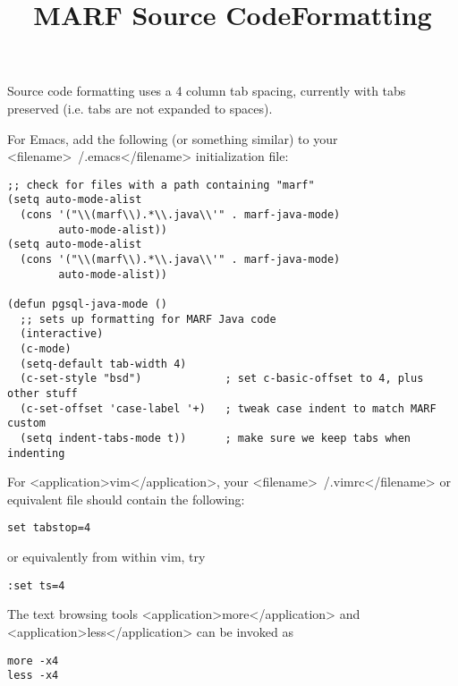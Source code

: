   \title{MARF Source Code}

   \title{Formatting}

   \par
    Source code formatting uses a 4 column tab spacing, currently with
    tabs preserved (i.e. tabs are not expanded to spaces).
   

   \par
    For Emacs, add the following (or something similar)
    to your <filename>~/.emacs</filename>
    initialization file:

\begin{verbatim}
;; check for files with a path containing "marf"
(setq auto-mode-alist
  (cons '("\\(marf\\).*\\.java\\'" . marf-java-mode)
        auto-mode-alist))
(setq auto-mode-alist
  (cons '("\\(marf\\).*\\.java\\'" . marf-java-mode)
        auto-mode-alist))

(defun pgsql-java-mode ()
  ;; sets up formatting for MARF Java code
  (interactive)
  (c-mode)
  (setq-default tab-width 4)
  (c-set-style "bsd")             ; set c-basic-offset to 4, plus other stuff
  (c-set-offset 'case-label '+)   ; tweak case indent to match MARF custom
  (setq indent-tabs-mode t))      ; make sure we keep tabs when indenting
\end{verbatim}
   

   \par
    For <application>vim</application>, your
    <filename>~/.vimrc</filename> or equivalent file should contain
    the following:

\begin{verbatim}
set tabstop=4
\end{verbatim}

    or equivalently from within vim, try

\begin{verbatim}
:set ts=4
\end{verbatim}
   

   \par
    The text browsing tools <application>more</application> and
    <application>less</application> can be invoked as

\begin{verbatim}
more -x4
less -x4
\end{verbatim}
